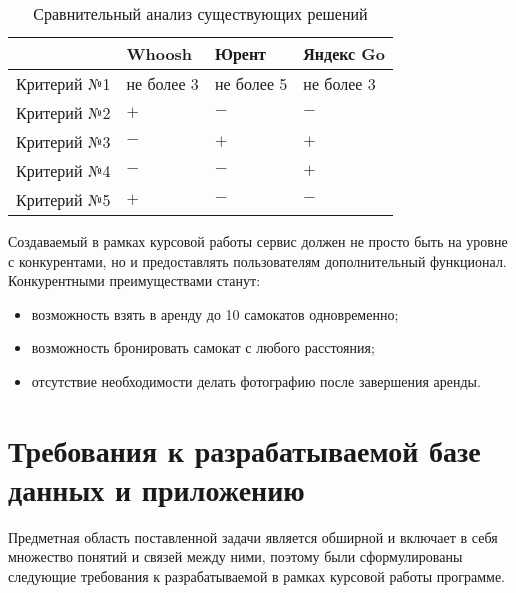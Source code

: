 \begin{table}[H]
	\caption{Сравнительный анализ существующих решений}
	\label{tbl:comparison}
	{\renewcommand{\arraystretch}{1.2}
		\begin{tabularx}{\textwidth}
			{
				| >{\raggedright\arraybackslash}X
				| >{\centering\arraybackslash}X
				| >{\centering\arraybackslash}X
				| >{\centering\arraybackslash}X |
			}
			\hline
			            & \textbf{Whoosh} & \textbf{Юрент} & \textbf{Яндекс Go} \\
			\hline
			Критерий №1 & не более 3      & не более 5     & не более 3         \\
			\hline
			Критерий №2 & $+$             & $-$            & $-$                \\
			\hline
			Критерий №3 & $-$             & $+$            & $+$                \\
			\hline
			Критерий №4 & $-$             & $-$            & $+$                \\
			\hline
			Критерий №5 & $+$             & $-$            & $-$                \\
			\hline
		\end{tabularx}}
\end{table}

Создаваемый в рамках курсовой работы сервис должен не просто быть на уровне с конкурентами, но и предоставлять пользователям дополнительный функционал. Конкурентными преимуществами станут:

\begin{itemize}
	\item возможность взять в аренду до 10 самокатов одновременно;
	\item возможность бронировать самокат с любого расстояния;
	\item отсутствие необходимости делать фотографию после завершения аренды.
\end{itemize}

\section{Требования к разрабатываемой базе данных и приложению}

Предметная область поставленной задачи является обширной и включает в себя множество понятий и связей между ними, поэтому были сформулированы следующие требования к разрабатываемой в рамках курсовой работы программе.

